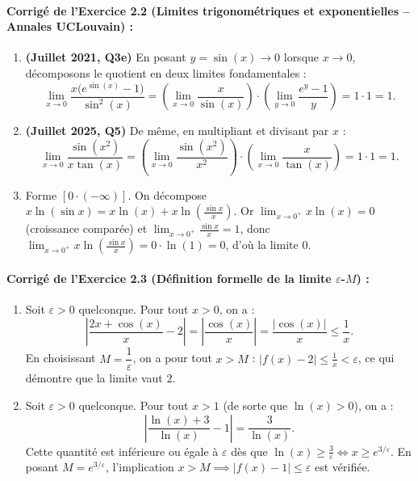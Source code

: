 \paragraph{Corrigé de l'Exercice 2.2 (Limites trigonométriques et exponentielles -- Annales UCLouvain) :}
\begin{enumerate}[label=(\alph*)]
    \item \textbf{(Juillet 2021, Q3e)} En posant $y = \sin(x) \to 0$ lorsque $x \to 0$, décomposons le quotient en deux limites fondamentales :
    \[
        \lim_{x \to 0} \frac{x\bigl(e^{\sin(x)} - 1\bigr)}{\sin^2(x)} = \left(\lim_{x \to 0} \frac{x}{\sin(x)}\right) \cdot \left(\lim_{y \to 0} \frac{e^y - 1}{y}\right) = 1 \cdot 1 = \boxed{1}.
    \]
    \item \textbf{(Juillet 2025, Q5)} De même, en multipliant et divisant par $x$ :
    \[
        \lim_{x \to 0} \frac{\sin(x^2)}{x\tan(x)} = \left(\lim_{x \to 0} \frac{\sin(x^2)}{x^2}\right) \cdot \left(\lim_{x \to 0} \frac{x}{\tan(x)}\right) = 1 \cdot 1 = \boxed{1}.
    \]
    \item Forme $[0 \cdot (-\infty)]$. On décompose $x\ln(\sin x) = x\ln(x) + x\ln\left(\frac{\sin x}{x}\right)$. Or $\lim_{x \to 0^+} x\ln(x) = 0$ (croissance comparée) et $\lim_{x \to 0^+} \frac{\sin x}{x} = 1$, donc $\lim_{x \to 0^+} x\ln\left(\frac{\sin x}{x}\right) = 0 \cdot \ln(1) = 0$, d'où la limite $\boxed{0}$.
\end{enumerate}

\paragraph{Corrigé de l'Exercice 2.3 (Définition formelle de la limite $\varepsilon$-$M$) :}
\begin{enumerate}[label=(\alph*)]
    \item Soit $\varepsilon > 0$ quelconque. Pour tout $x > 0$, on a :
    \[
        \left|\frac{2x + \cos(x)}{x} - 2\right| = \left|\frac{\cos(x)}{x}\right| = \frac{|\cos(x)|}{x} \le \frac{1}{x}.
    \]
    En choisissant $\boxed{M = \dfrac{1}{\varepsilon}}$, on a pour tout $x > M$ : $|f(x) - 2| \le \frac{1}{x} < \varepsilon$, ce qui démontre que la limite vaut $2$.
    \item Soit $\varepsilon > 0$ quelconque. Pour tout $x > 1$ (de sorte que $\ln(x) > 0$), on a :
    \[
        \left|\frac{\ln(x) + 3}{\ln(x)} - 1\right| = \frac{3}{\ln(x)}.
    \]
    Cette quantité est inférieure ou égale à $\varepsilon$ dès que $\ln(x) \ge \frac{3}{\varepsilon} \iff x \ge e^{3/\varepsilon}$. En posant $\boxed{M = e^{3/\varepsilon}}$, l'implication $x > M \implies |f(x) - 1| \le \varepsilon$ est vérifiée.
\end{enumerate}

